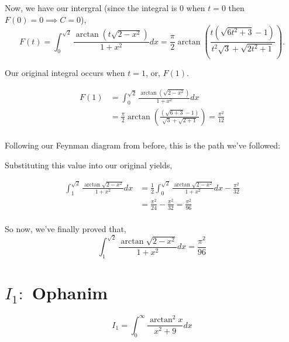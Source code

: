 \documentclass{article}
\begin{document}
Now, we have our intergral (since the integral is $0$ when $t = 0$ then $F(0) = 0 \implies C = 0$),
$$
F(t) = \int_{0}^{\sqrt{2}}{\frac{\arctan{(t\sqrt{2 - x^2})}}{1 + x^2}dx} = \frac{\pi}{2}\arctan{\left( \frac{t(\sqrt{6t^2 + 3} - 1)}{t^2\sqrt{3} + \sqrt{2t^2 + 1}} \right)}.
$$

Our original integral occurs when $t = 1$, or, $F(1)$. 

\begin{align*}
    F(1) &= \int_{0}^{\sqrt{2}}{\frac{\arctan{(\sqrt{2 - x^2})}}{1 + x^2}dx} \\
    &= \frac{\pi}{2}\arctan{\left( \frac{(\sqrt{6 + 3} - 1)}{\sqrt{3} + \sqrt{2 + 1}} \right)} = \frac{\pi^2}{12}\\
\end{align*}

Following our Feynman diagram from before, this is the path we've followed:

\begin{center}
\end{center}

Substituting this value into our original yields, 

\begin{align*}
   \int_{1}^{\sqrt{2}}{\frac{\arctan{\sqrt{2 - x^2}}}{1+x^2}dx} &= \frac{1}{2}\int_{0}^{\sqrt{2}}{\frac{\arctan{\sqrt{2 - x^2}}}{1+x^2}dx} - \frac{\pi^2}{32} \\
   &= \frac{\pi^2}{24} - \frac{\pi^2}{32} = \frac{\pi^2}{96}\\
\end{align*}

So now, we've finally proved that,
$$\boxed{\int_{1}^{\sqrt{2}}{\frac{\arctan{\sqrt{2 - x^2}}}{1+x^2}dx} = \frac{\pi^2}{96}}$$


\section{$I_{1}:$ Ophanim}
$$
I_{1} = \int_{0}^{\infty}{\frac{\arctan^2{x}}{x^2 + 9}dx}
$$
\end{document}
